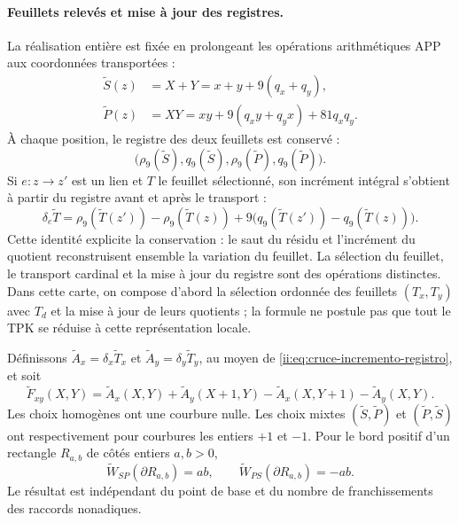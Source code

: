 \paragraph{Feuillets relevés et mise à jour des registres.}
La réalisation entière est fixée en prolongeant les opérations arithmétiques
APP aux coordonnées transportées :
\begin{align*}
 \widetilde S(z)&=X+Y=x+y+9(q_x+q_y),\\
 \widetilde P(z)&=XY
 =xy+9(q_xy+q_yx)+81q_xq_y.
\end{align*}
À chaque position, le registre des deux feuillets est conservé :
\[
 \bigl(\rho_9(\widetilde S),q_9(\widetilde S),
       \rho_9(\widetilde P),q_9(\widetilde P)\bigr).
\]
Si $e:z\to z'$ est un lien et $T$ le feuillet sélectionné, son incrément
intégral s'obtient à partir du registre avant et après le transport :
\begin{equation}
 \delta_e\widetilde T=
 \rho_9(\widetilde T(z'))-\rho_9(\widetilde T(z))
 +9\bigl(q_9(\widetilde T(z'))-q_9(\widetilde T(z))\bigr).
 \label{ii:eq:cruce-incremento-registro}
\end{equation}
Cette identité explicite la conservation : le saut du résidu et
l'incrément du quotient reconstruisent ensemble la variation du feuillet.
La sélection du feuillet, le transport cardinal et la mise à jour du
registre sont des opérations distinctes. Dans cette carte, on compose d'abord la
sélection ordonnée des feuillets $(T_x,T_y)$ avec $T_d$ et la mise à jour
de leurs quotients ; la formule ne postule pas que tout le TPK se réduise
à cette représentation locale.

\begin{proposition}
\label{ii:prop:cruce-stokes-integral}
Définissons
$\widetilde A_x=\delta_x\widetilde T_x$ et
$\widetilde A_y=\delta_y\widetilde T_y$, au moyen de
\eqref{ii:eq:cruce-incremento-registro}, et soit
\[
 \widetilde F_{xy}(X,Y)=
 \widetilde A_x(X,Y)+\widetilde A_y(X+1,Y)
 -\widetilde A_x(X,Y+1)-\widetilde A_y(X,Y).
\]
Les choix homogènes ont une courbure nulle. Les choix mixtes
$(\widetilde S,\widetilde P)$ et
$(\widetilde P,\widetilde S)$ ont respectivement pour courbures les entiers
$+1$ et $-1$. Pour le bord positif d'un rectangle
$R_{a,b}$ de côtés entiers $a,b>0$,
\[
 \widetilde W_{SP}(\partial R_{a,b})=ab,\qquad
 \widetilde W_{PS}(\partial R_{a,b})=-ab.
\]
Le résultat est indépendant du point de base et du nombre de franchissements
des raccords nonadiques.
\end{proposition}

